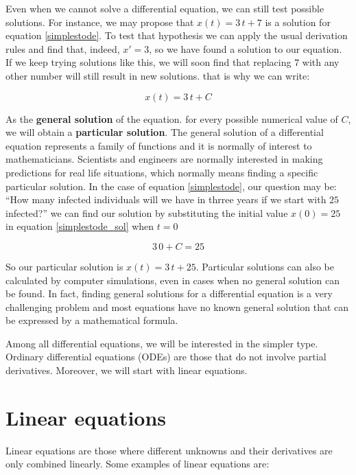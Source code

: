 \documentclass{tufte-book} %
\begin{document}
Even when we cannot solve a differential equation, we can still test possible solutions. For instance, we may propose  that $x(t) = 3\, t + 7$ is a solution for equation \ref{simplestode}. To test that hypothesis we can apply the usual derivation rules and find that, indeed, $x' = 3$, so we have found a solution to our equation. If we keep trying solutions like this, we will soon find that replacing $7$ with any other number will still result in new solutions. that is why we can write: 

\begin{equation}
	x(t) = 3\, t + C
	\label{simplestode_sol}
\end{equation}

As the \textbf{general solution} of the equation. for every possible numerical value of $C$, we will obtain a \textbf{particular solution}. The general solution of a differential equation represents a family of functions and it is normally of interest to mathematicians. Scientists and engineers are normally interested in making predictions for real life situations, which normally means finding a specific particular solution. In the case of equation \ref{simplestode}, our question may be: ``How many infected individuals will we have in thrree years if we start with $25$ infected?'' we can find our solution by substituting the  initial value $x(0)=25$ in equation \ref{simplestode_sol} when $t=0$

\begin{equation*}
	3\, 0 + C = 25
\end{equation*}

So our particular solution is  $x(t) = 3\, t + 25$. Particular solutions can also be calculated by computer simulations, even in cases when no general solution can be found. In fact, finding general solutions for a differential equation is a very challenging problem and most equations have no known general solution that can be expressed by a mathematical formula.

Among all differential equations, we will be interested in the simpler type. Ordinary differential equations (ODEs) are those that do not involve partial derivatives. Moreover, we will start with linear equations.

\section{Linear equations}

Linear equations are those where different unknowns and their derivatives are only combined linearly. Some examples of linear equations are:
\end{document}
